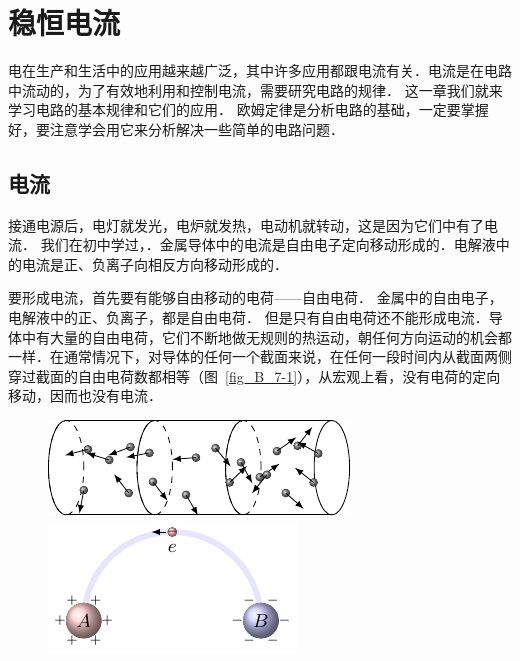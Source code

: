 \chapter{稳恒电流}\label{chapter-steady-current}

电在生产和生活中的应用越来越广泛，其中许多应用都跟电流有关．电流是在电路中流动的，为了有效地利用和控制电流，需要研究电路的规律．
这一章我们就来学习电路的基本规律和它们的应用．
欧姆定律是分析电路的基础，一定要掌握好，要注意学会用它来分析解决一些简单的电路问题．

\section{电流}
接通电源后，电灯就发光，电炉就发热，电动机就转动，这是因为它们中有了电流．
我们在初中学过，．金属导体中的电流是自由电子定向移动形成的．电解液中的电流是正、负离子向相反方向移动形成的．

要形成电流，首先要有能够自由移动的电荷——自由电荷．
金属中的自由电子，电解液中的正、负离子，都是自由电荷．
但是只有自由电荷还不能形成电流．导体中有大量的自由电荷，它们不断地做无规则的热运动，朝任何方向运动的机会都一样．在通常情况下，对导体的任何一个截面来说，在任何一段时间内从截面两侧穿过截面的自由电荷数都相等（图~\ref{fig_B_7-1}），从宏观上看，没有电荷的定向移动，因而也没有电流．
\begin{figure}[htbp]
    \centering
    \begin{minipage}[t]{0.48\linewidth}
    	\centering
    	\includegraphics{fig/B/7-1.pdf}
    	\caption{}\label{fig_B_7-1}
    \end{minipage}
   \begin{minipage}[t]{0.48\linewidth}
   		\centering
   		\includegraphics{fig/B/7-2.pdf}
   		\caption{}\label{fig_B_7-2}
   \end{minipage}
\end{figure}

